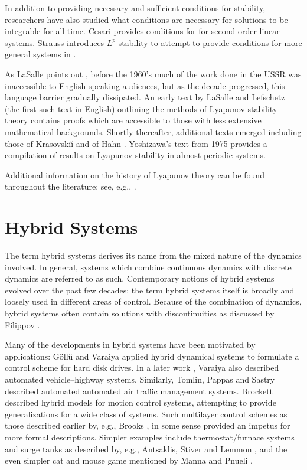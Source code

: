In addition to providing necessary and sufficient conditions for stability,
researchers have also studied what conditions are necessary for solutions to be
integrable for all time.
%
Cesari provides conditions for \cite[\S 1.5]{Cesari1971} for second-order linear
systems.
%
Strauss introduces $L^{p}$ stability to attempt to provide conditions for more
general systems in \cite{Strauss1965}.

As LaSalle points out \cite{LaSalle1964}, before the 1960's much of the work
done in the USSR was inaccessible to English-speaking audiences, but as the
decade progressed, this language barrier gradually dissipated.
%
An early text by LaSalle and Lefschetz (the first such text in English)
\cite{LaSalle1961} outlining the methods of Lyapunov stability theory contains
proofs which are accessible to those with less extensive mathematical
backgrounds.
%
Shortly thereafter, additional texts emerged including those of Krasovski\u{\i}
\cite{Krasovskii1963} and of Hahn \cite{Hahn1967}.
%
Yoshizawa's text from 1975 \cite{Yoshizawa1975} provides a compilation of
results on Lyapunov stability in almost periodic systems.

Additional information on the history of Lyapunov theory can be found throughout
the literature; see, e.g., \cite{Michel2007, Teel1999}.
%

\section{Hybrid Systems}

The term hybrid systems derives its name from the mixed nature of the dynamics
involved.
%
In general, systems which combine continuous dynamics with discrete dynamics are
referred to as such.
%
Contemporary notions of hybrid systems evolved over the past few decades;
%
the term hybrid systems itself is broadly and loosely used in different areas of
control.
%
Because of the combination of dynamics, hybrid systems often contain solutions
with discontinuities as discussed by Filippov \cite{Filippov1988}.

Many of the developments in hybrid systems have been motivated by applications:
%
G{\"{o}}ll{\"{u}} and Varaiya \cite{Gollu1989} applied hybrid dynamical systems to
formulate a control scheme for hard disk drives.
%
In a later work \cite{Varaiya1993}, Varaiya also described automated
vehicle--highway systems.
%
Similarly, Tomlin, Pappas and Sastry \cite{Tomlin1998} described automated
automated air traffic management systems.
%
Brockett \cite{Brockett1993} described hybrid models for motion control systems,
attempting to provide generalizations for a wide class of systems.
%
Such multilayer control schemes as those described earlier by, e.g., Brooks
\cite{Brooks1986}, in some sense provided an impetus for more formal
descriptions.
%
Simpler examples include thermostat/furnace systems and surge tanks as described
by, e.g., Antsaklis, Stiver and Lemmon \cite{Antsaklis1993}, and the even
simpler cat and mouse game mentioned by Manna and Pnueli \cite{Manna1993}.

